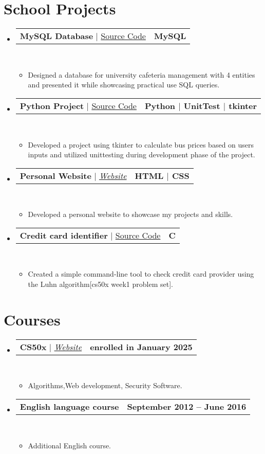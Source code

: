 \documentclass[letterpaper,11pt]{article}
\makeatletter
\newcommand{\resumeItem}[1]{
  \item\small{
    {#1 \vspace{0pt}}
  }
}
\newcommand{\resumeProjectHeading}[2]{
    \item
    \begin{tabular*}{1.001\textwidth}{l@{\extracolsep{\fill}}r}
      \small#1 & \textbf{\small #2}\\
    \end{tabular*}\vspace{-7pt}
}
\newcommand{\resumeSubHeadingListStart}{\begin{itemize}[leftmargin=0.0in, label={}]}
\newcommand{\resumeSubHeadingListEnd}{\end{itemize}}\vspace{0pt}
\newcommand{\resumeItemListStart}{\begin{itemize}}
\newcommand{\resumeItemListEnd}{\end{itemize}\vspace{-5pt}}
\makeatother
\begin{document}
\section{School Projects} 
    \vspace{-5pt}
    \resumeSubHeadingListStart
    \resumeProjectHeading
            {\textbf{{MySQL Database}} $|$ \href{https://github.com/DominikGmitter/cafeteria/blob/main/projekt.sql}{Source Code}}{MySQL}
            \\[5mm]
          \resumeItemListStart
            \resumeItem{Designed a database for university cafeteria management with 4 entities and presented it while showcasing practical use SQL queries.}
          \resumeItemListEnd
 \vspace{-21pt}
 \resumeProjectHeading
            {\textbf{{Python Project}} $|$ \href{https://github.com/DominikGmitter/busCount/tree/main}{Source Code}}{Python $|$ UnitTest $|$ tkinter}
            \\[5mm]
          \resumeItemListStart
            \resumeItem{Developed a project using tkinter to calculate bus prices based on users inputs and utilized unittesting during development phase of the project.}
          \resumeItemListEnd
 \vspace{-21pt}
 \resumeProjectHeading
            {\textbf{{Personal Website}} $|$ \emph{\href{https://dominikgmitter.github.io/webstranka/}{Website}}}{HTML $|$ CSS }
            \\[5mm]
          \resumeItemListStart
            \resumeItem{Developed a personal website to showcase my projects and skills.}
          \resumeItemListEnd
 \vspace{-21pt}
 \resumeProjectHeading
            {\textbf{{Credit card identifier}} $|$ \href{https://github.com/DominikGmitter/kreditka/blob/main/credit.c}{Source Code}}{C}
            \\[5mm]
          \resumeItemListStart
            \resumeItem{Created a simple command-line tool to check credit card provider using the Luhn algorithm[cs50x week1 problem set].}
          \resumeItemListEnd
 \resumeSubHeadingListEnd
 \vspace{-28pt}

\section{Courses} 
    \vspace{-5pt}
    \resumeSubHeadingListStart
    \resumeProjectHeading
            {\textbf{{CS50x}} $|$ \emph{\href{https://www.edx.org/learn/computer-science/harvard-university-cs50-s-introduction-to-computer-science}{Website}}}{enrolled in January 2025}
	\\
          \resumeItemListStart
            \resumeItem{Algorithms,Web development, Security Software.}
          \resumeItemListEnd
 \vspace{-20pt}
 \resumeProjectHeading
            {\textbf{English language course}}{September 2012 -- June 2016}
            \\
          \resumeItemListStart
            \resumeItem{Additional English course.}
          \resumeItemListEnd
\resumeSubHeadingListEnd
\vspace{-25pt}
\end{document}
